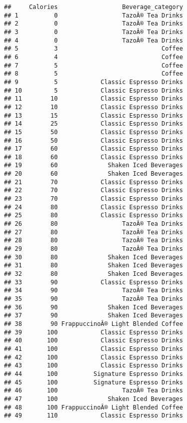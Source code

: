 \documentclass[
]{article}
\begin{document}
\begin{verbatim}
##     Calories                  Beverage_category
## 1          0                  TazoÂ® Tea Drinks
## 2          0                  TazoÂ® Tea Drinks
## 3          0                  TazoÂ® Tea Drinks
## 4          0                  TazoÂ® Tea Drinks
## 5          3                             Coffee
## 6          4                             Coffee
## 7          5                             Coffee
## 8          5                             Coffee
## 9          5            Classic Espresso Drinks
## 10         5            Classic Espresso Drinks
## 11        10            Classic Espresso Drinks
## 12        10            Classic Espresso Drinks
## 13        15            Classic Espresso Drinks
## 14        25            Classic Espresso Drinks
## 15        50            Classic Espresso Drinks
## 16        50            Classic Espresso Drinks
## 17        60            Classic Espresso Drinks
## 18        60            Classic Espresso Drinks
## 19        60              Shaken Iced Beverages
## 20        60              Shaken Iced Beverages
## 21        70            Classic Espresso Drinks
## 22        70            Classic Espresso Drinks
## 23        70            Classic Espresso Drinks
## 24        80            Classic Espresso Drinks
## 25        80            Classic Espresso Drinks
## 26        80                  TazoÂ® Tea Drinks
## 27        80                  TazoÂ® Tea Drinks
## 28        80                  TazoÂ® Tea Drinks
## 29        80                  TazoÂ® Tea Drinks
## 30        80              Shaken Iced Beverages
## 31        80              Shaken Iced Beverages
## 32        80              Shaken Iced Beverages
## 33        90            Classic Espresso Drinks
## 34        90                  TazoÂ® Tea Drinks
## 35        90                  TazoÂ® Tea Drinks
## 36        90              Shaken Iced Beverages
## 37        90              Shaken Iced Beverages
## 38        90 FrappuccinoÂ® Light Blended Coffee
## 39       100            Classic Espresso Drinks
## 40       100            Classic Espresso Drinks
## 41       100            Classic Espresso Drinks
## 42       100            Classic Espresso Drinks
## 43       100            Classic Espresso Drinks
## 44       100          Signature Espresso Drinks
## 45       100          Signature Espresso Drinks
## 46       100                  TazoÂ® Tea Drinks
## 47       100              Shaken Iced Beverages
## 48       100 FrappuccinoÂ® Light Blended Coffee
## 49       110            Classic Espresso Drinks

\end{verbatim}
\end{document}
